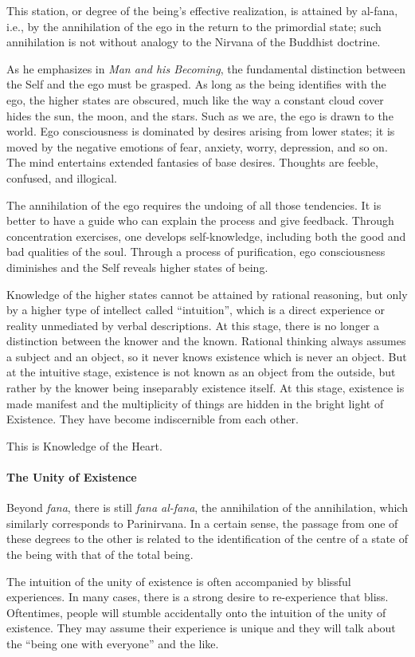 \begin{quotex}
This station, or degree of the being's effective realization, is attained by al-fana, i.e., by the annihilation of the ego in the return to the primordial state; such annihilation is not without analogy to the Nirvana of the Buddhist doctrine. 

\end{quotex}
As he emphasizes in \emph{Man and his Becoming}, the fundamental distinction between the Self and the ego must be grasped. As long as the being identifies with the ego, the higher states are obscured, much like the way a constant cloud cover hides the sun, the moon, and the stars. Such as we are, the ego is drawn to the world. Ego consciousness is dominated by desires arising from lower states; it is moved by the negative emotions of fear, anxiety, worry, depression, and so on. The mind entertains extended fantasies of base desires. Thoughts are feeble, confused, and illogical.

The annihilation of the ego requires the undoing of all those tendencies. It is better to have a guide who can explain the process and give feedback. Through concentration exercises, one develops self-knowledge, including both the good and bad qualities of the soul. Through a process of purification, ego consciousness diminishes and the Self reveals higher states of being.

Knowledge of the higher states cannot be attained by rational reasoning, but only by a higher type of intellect called “intuition”, which is a direct experience or reality unmediated by verbal descriptions. At this stage, there is no longer a distinction between the knower and the known. Rational thinking always assumes a subject and an object, so it never knows existence which is never an object. But at the intuitive stage, existence is not known as an object from the outside, but rather by the knower being inseparably existence itself. At this stage, existence is made manifest and the multiplicity of things are hidden in the bright light of Existence. They have become indiscernible from each other.

This is Knowledge of the Heart.

\paragraph{The Unity of Existence}
\begin{quotex}
Beyond \emph{fana}, there is still \emph{fana al-fana}, the annihilation of the annihilation, which similarly corresponds to Parinirvana. In a certain sense, the passage from one of these degrees to the other is related to the identification of the centre of a state of the being with that of the total being. 

\end{quotex}
The intuition of the unity of existence is often accompanied by blissful experiences. In many cases, there is a strong desire to re-experience that bliss. Oftentimes, people will stumble accidentally onto the intuition of the unity of existence. They may assume their experience is unique and they will talk about the “being one with everyone” and the like.

